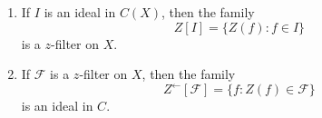 \begin{enumerate}
\item[(a)] If $I$ is an ideal in $C(X)$, then the family
$$Z[I] = \{Z(f) : f \in I\}$$
is a $z$-filter on $X$.
\item[(b)] If $\mathcal{F}$ is a $z$-filter on $X$, then the family
$$Z^{\leftarrow}[\mathcal{F}] = \{f : Z(f) \in \mathcal{F}\}$$
is an ideal in $C$.
\end{enumerate}
